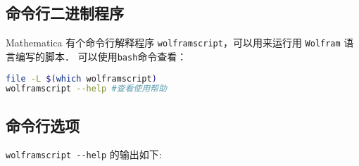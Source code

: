 
\begin{issues}
\issueDraft
\issueTODO
\end{issues}

\subsection{命令行二进制程序}

Mathematica 有个命令行解释程序 \verb`wolframscript`，可以用来运行用 \verb`Wolfram` 语言编写的脚本．
可以使用\verb`bash`命令查看：
\begin{lstlisting}[language=bash]
file -L $(which wolframscript)
wolframscript --help #查看使用帮助
\end{lstlisting}

\subsection{命令行选项} 

\verb`wolframscript --help` 的输出如下:

